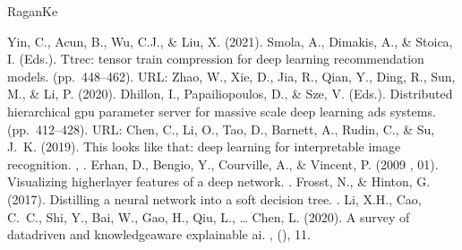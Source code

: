 \documentclass[letterpaper,10pt,english]{sphinxmanual}
\begin{document}
\begin{sphinxthebibliography}{Ragan\sphinxhyphen{}Ke}
\begin{footnote}[84]
%
\end{footnote}
\sphinxAtStartPar
Yin, C., Acun, B., Wu, C.\sphinxhyphen{}J., \& Liu, X. (2021). Smola, A., Dimakis, A., \& Stoica, I. (Eds.). Tt\sphinxhyphen{}rec: tensor train compression for deep learning recommendation models.  (pp. 448–462). URL: 
\sphinxAtStartPar
Zhao, W., Xie, D., Jia, R., Qian, Y., Ding, R., Sun, M., \& Li, P. (2020). Dhillon, I., Papailiopoulos, D., \& Sze, V. (Eds.). Distributed hierarchical gpu parameter server for massive scale deep learning ads systems.  (pp. 412–428). URL: 
\sphinxAtStartPar
Chen, C., Li, O., Tao, D., Barnett, A., Rudin, C., \& Su, J. K. (2019). This looks like that: deep learning for interpretable image recognition. , .
\sphinxAtStartPar
Erhan, D., Bengio, Y., Courville, A., \& Vincent, P. (2009 , 01). Visualizing higher\sphinxhyphen{}layer features of a deep network. .
\sphinxAtStartPar
Frosst, N., \& Hinton, G. (2017). Distilling a neural network into a soft decision tree. .
\sphinxAtStartPar
Li, X.\sphinxhyphen{}H., Cao, C. C., Shi, Y., Bai, W., Gao, H., Qiu, L., … Chen, L. (2020). A survey of data\sphinxhyphen{}driven and knowledge\sphinxhyphen{}aware explainable ai. , (), 1\sphinxhyphen{}1. %
\begin{footnote}[88]\sphinxAtStartFootnote
{}
%
\end{footnote}

\end{sphinxthebibliography}
\end{document}

